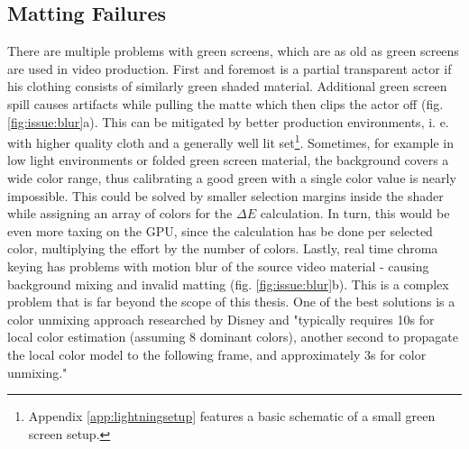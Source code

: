 \subsection{Matting Failures}

There are multiple problems with green screens, which are as old as green 
screens are used in video production. First and foremost is a partial 
transparent actor if his clothing consists of similarly green shaded material.
\newline
Additional green screen spill causes artifacts while pulling the matte which 
then clips the actor off (fig. \ref{fig:issue:blur}a). This can be mitigated 
by better production 
environments, i. e. with higher quality cloth and a generally well lit 
set\footnote{Appendix \ref{app:lightningsetup} features a basic schematic of a 
small green screen setup.}.
\newline
Sometimes, for example in low light environments or folded green screen 
material, the background covers a wide color range, thus calibrating a good 
green with a single color value is nearly impossible. This could be solved by 
smaller selection margins inside the shader while assigning an array of colors 
for the $\Delta E$ calculation. In turn, this would be even more taxing on the 
GPU, since the calculation has be done per selected color, multiplying the 
effort by the number of colors.
\newline
Lastly, real time chroma keying has problems with motion blur of the source 
video material - causing background mixing and invalid matting (fig. 
\ref{fig:issue:blur}b). This is a complex problem that is far beyond the scope 
of this thesis. One of the best solutions is a color unmixing approach 
researched by Disney and "typically requires 10s for local color estimation 
(assuming 8 dominant colors), another second to propagate the local color model 
to the following frame, and approximately 3s for color unmixing." 
\cite{disney:unmixing:2017}

